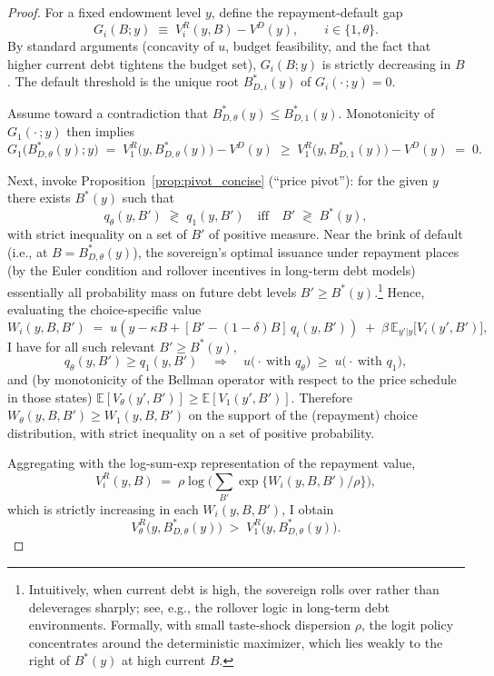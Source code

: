 \documentclass[12pt]{article}
\theoremstyle{plain}
\newcommand{\E}{\mathbb{E}}
\begin{document}
\begin{proof}
	For a fixed endowment level \(y\), define the repayment-default gap
	\[
		G_i(B;y)\;\equiv\;V^R_i(y,B)-V^D(y),\qquad i\in\{1,\theta\}.
	\]
	By standard arguments (concavity of \(u\), budget feasibility, and the fact
	that higher current debt tightens the budget set), \(G_i(B;y)\) is strictly
	decreasing in \(B\). The default threshold is the unique root \(B^*_{D,i}(y)\)
	of \(G_i(\cdot\,;y)=0\).

	Assume toward a contradiction that \(B^*_{D,\theta}(y)\le B^*_{D,1}(y)\).
	Monotonicity of \(G_1(\cdot\,;y)\) then implies
	\begin{equation}
		G_1\!\big(B^*_{D,\theta}(y);y\big)\;=\;V^R_1\!\big(y,B^*_{D,\theta}(y)\big)-V^D(y)
		\;\ge\;V^R_1\!\big(y,B^*_{D,1}(y)\big)-V^D(y)\;=\;0.
		\label{eq:baseline_nonnegative}
	\end{equation}

	Next, invoke Proposition~\ref{prop:pivot_concise} (“price pivot”): for the
	given \(y\) there exists \(B^*(y)\) such that
	\[
		q_\theta(y,B') \;\gtrless\; q_1(y,B')\quad\text{iff}\quad B' \;\gtrless\; B^*(y),
	\]
	with strict inequality on a set of \(B'\) of positive measure. Near the brink
	of default (i.e., at \(B=B^*_{D,\theta}(y)\)), the sovereign’s optimal issuance
	under repayment places (by the Euler condition and rollover incentives in
	long-term debt models) essentially all probability mass on future debt levels
	\(B'\ge B^*(y)\).\footnote{Intuitively, when current debt is high, the
		sovereign rolls over rather than deleverages sharply; see, e.g., the rollover
		logic in long-term debt environments. Formally, with small taste-shock
		dispersion \(\rho\), the logit policy concentrates around the deterministic
		maximizer, which lies weakly to the right of \(B^*(y)\) at high current \(B\).}
	Hence, evaluating the choice-specific value
	\[
		W_i(y,B,B') \;=\; u\!\left(y-\kappa B + [B'-(1-\delta)B]\,q_i(y,B')\right)
		\;+\; \beta\,\E_{y'|y}\big[V_i(y',B')\big],
	\]
	I have for all such relevant \(B'\ge B^*(y)\),
	\[
		q_\theta(y,B') \ge q_1(y,B') \quad\Longrightarrow\quad
		u\!\big(\cdot\ \text{with }q_\theta\big)\; \ge\; u\!\big(\cdot\ \text{with }q_1\big),
	\]
	and (by monotonicity of the Bellman operator with respect to the price schedule
	in those states) \(\E[V_\theta(y',B')]\ge \E[V_1(y',B')]\). Therefore
	\(W_\theta(y,B,B')\ge W_1(y,B,B')\) on the support of the (repayment) choice
	distribution, with strict inequality on a set of positive probability.

	Aggregating with the log-sum-exp representation of the repayment value,
	\[
		V^R_i(y,B) \;=\; \rho \log\!\Big(\sum_{B'} \exp\{W_i(y,B,B')/\rho\}\Big),
	\]
	which is strictly increasing in each \(W_i(y,B,B')\), I obtain
	\begin{equation}
		V^R_\theta\!\big(y,B^*_{D,\theta}(y)\big) \;>\; V^R_1\!\big(y,B^*_{D,\theta}(y)\big).
		\label{eq:VR_dominance}
	\end{equation}


\end{proof}
\end{document}
